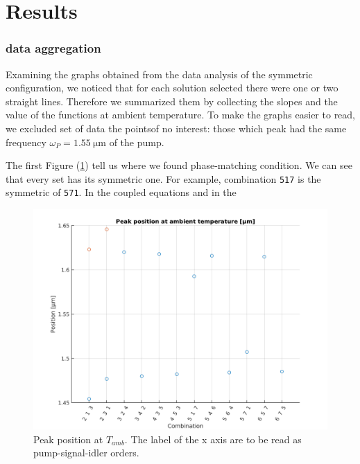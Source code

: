 \documentclass[12pt,a4paper,twoside]{article}
\begin{document}
\section{Results}
\subsubsection{data aggregation}
Examining the graphs obtained from the data analysis of the symmetric configuration, we noticed that for each solution selected there were one or two straight lines.
Therefore we summarized them by collecting the slopes and the value of the functions at ambient temperature.
To make the graphs easier to read, we excluded set of data the pointsof no interest: those which peak had the same frequency $\omega_P = \SI{1.55}{\um}$ of the pump.

The first Figure (\ref{fig_sym_pp@t2}) tell us where we found phase-matching condition.
We can see that every set has its symmetric one.
For example, combination \texttt{517} is the symmetric of \texttt{571}.
In the coupled equations and in the 

\begin{figure}[!h]
	\centering
	\includegraphics[width=.75\textwidth]{ppaat2.png}
	\caption{Peak position at $T_{amb}$. The label of the x axis are to be read as pump-signal-idler orders.}
	\label{fig_sym_pp@t2} 	%
\end{figure}
\end{document}
